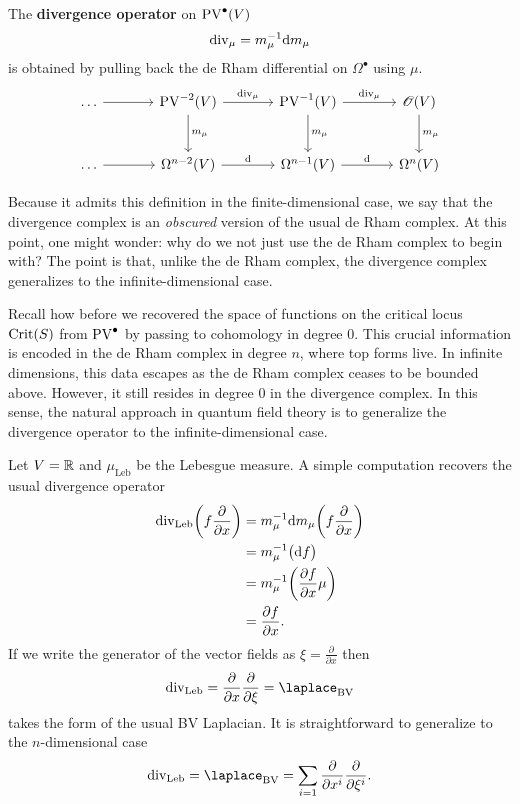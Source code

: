 The \textbf{divergence operator} on $\operatorname{PV}^{\bullet}(V)$
\begin{equation*}
  \operatorname{div}_\mu = m_\mu^{-1} \mathrm{d} m_\mu
\end{equation*}
is obtained by pulling back the de Rham differential on $\Omega^{\bullet}$ using $\mu$.
\begin{equation*}
  \begin{tikzcd}[sep=large]
    \dots 
    \arrow[r] &
    \PV^{-2}(V)
    \arrow[r, "\divergence_\mu"] \arrow[d, "m_\mu"] &
    \PV^{-1}(V)
    \arrow[r, "\divergence_\mu"] \arrow[d, "m_\mu"] &
    \Oscr(V)
    \arrow[d, "m_\mu"] \\
    \dots \arrow[r] &
    \Omega^{n-2}(V)
    \arrow[r, "\drm"] &
    \Omega^{n-1}(V)
    \arrow[r, "\drm"] &
    \Omega^{n}(V)
  \end{tikzcd}
\end{equation*}

Because it admits this definition in the finite-dimensional case, we say that the divergence complex is an \textit{obscured} version of the usual de Rham complex.
At this point, one might wonder: why do we not just use the de Rham complex to begin with?
The point is that, unlike the de Rham complex, the divergence complex generalizes to the infinite-dimensional case.

Recall how before we recovered the space of functions on the critical locus $\operatorname{Crit}(S)$ from $\operatorname{PV}^{\bullet}$ by passing to cohomology in degree $0$.
This crucial information is encoded in the de Rham complex in degree $n$, where top forms live.
In infinite dimensions, this data escapes as the de Rham complex ceases to be bounded above.
However, it still resides in degree $0$ in the divergence complex.
In this sense, the natural approach in quantum field theory is to generalize the divergence operator to the infinite-dimensional case.

\begin{example}
  Let $V = \mathbb{R}$ and $\mu_\text{Leb}$ be the Lebesgue measure. A simple computation recovers the usual divergence operator
  \begin{align*}
    \operatorname{div}_\text{Leb} \biggl( f \frac{\partial}{\partial  x} \biggr)
    &= m_\mu^{-1} \mathrm{d} m_\mu \biggl( f \frac{\partial}{\partial x} \biggr) \\
    &= m_\mu^{-1} \bigl( \mathrm{d} f\bigr) \\
    &= m_\mu^{-1} \biggl( \frac{\partial f}{\partial x} \mu \biggr) \\
    &= \frac{\partial f}{\partial x}.
  \end{align*}
  If we write the generator of the vector fields as $\xi = \frac{\partial}{\partial x}$ then
  \begin{equation*}
    \divergence_\text{Leb} = \frac{\partial}{\partial x} \frac{\partial}{\partial \xi} = \bv
  \end{equation*}
  takes the form of the usual BV Laplacian.
  It is straightforward to generalize to the $n$-dimensional case
  \begin{equation*}
    \divergence_{\text{Leb}} = \bv
    = \sum_{i = 1} \frac{\partial}{\partial x^i} \frac{\partial}{\partial \xi^i}.
  \end{equation*}
\end{example}

